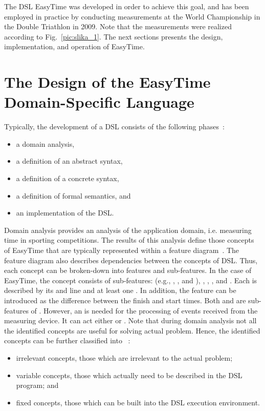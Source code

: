 \documentclass[preprint, prX]{revtex4}
\begin{document}
The DSL EasyTime was developed in order to achieve this goal, and has been employed in practice by conducting measurements at the World Championship in the Double Triathlon in 2009. Note that the measurements were realized according to Fig.~\ref{pic:slika_1}. The next sections presents the design, implementation, and operation of EasyTime.

\section{The Design of the EasyTime Domain-Specific Language}

Typically, the development of a DSL consists of the following phases~\cite{Mernik:2005}:
\begin{itemize}
  \item a domain analysis,
  \item a definition of an abstract syntax,
  \item a definition of a concrete syntax,
  \item a definition of formal semantics, and
  \item an implementation of the DSL.
\end{itemize}

Domain analysis provides an analysis of the application domain, i.e. measuring time in sporting competitions. The results of this
analysis define those concepts of EasyTime that are typically represented within a feature diagram~\cite{Deursen:2002,Stuikys:2009}. The feature diagram also describes dependencies between the concepts of DSL. Thus, each concept can be broken-down into features and sub-features. In the case of EasyTime, the concept  consists of sub-features:  (e.g., , , and ), , ,  , and . Each  is described by its  and  line and at least one . In addition, the feature  can be introduced as the difference between the finish and start times. Both  and  are sub-features of . However, an  is needed for the processing of events received from the measuring device. It can act either  or .
Note that during domain analysis not all the identified concepts are useful for solving actual problem. Hence, the identified concepts can be further classified into ~\cite{Mauw:2004}:

\begin{itemize}
  \item irrelevant concepts, those which are irrelevant to the actual problem;
  \item variable concepts, those which actually need to be described in the DSL program; and
  \item fixed concepts, those which can be built into the DSL execution environment.
\end{itemize}
\end{document}
